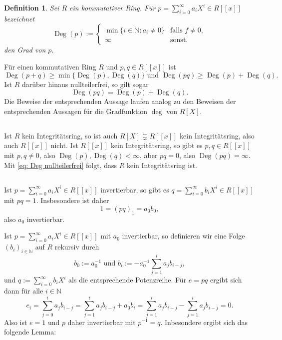 \documentclass[a4paper,10pt]{article}
\newtheorem*{defi}{Definition}
\theoremstyle{definition}
\newcommand{\N}{\mathbb{N}}
\newcommand{\Deg}{\operatorname{Deg}}
\begin{document}
\begin{defi}
Sei $R$ ein kommutativer Ring. Für $p = \sum_{i=0}^\infty a_i X^i \in R[\![x]\!]$ bezeichnet
\[
 \Deg(p) :=
 \begin{cases}
  \min \{i \in \N : a_i \neq 0\} & \text{falls } f \neq 0, \\
                          \infty & \text{sonst}.
 \end{cases}
\]
den Grad von $p$.
\end{defi}
Für einen kommutativen Ring $R$ und $p,q \in R[\![x]\!]$ ist
\begin{equation}\label{eq: Deg Ungleichungen}
 \Deg(p+q) \geq \min \{\Deg(p), \Deg(q)\} \text{ und }
 \Deg(pq) \geq \Deg(p) + \Deg(q).
\end{equation}
Ist $R$ darüber hinaus nullteilerfrei, so gilt sogar
\begin{equation}\label{eq: Deg nullteilerfrei}
 \Deg(pq) = \Deg(p) + \Deg(q).
\end{equation}
Die Beweise der entsprechenden Aussage laufen analog zu den Beweisen der entsprechenden Aussagen für die Gradfunktion $\deg$ von $R[X]$.


\subsection{}
Ist $R$ kein Integritätsring, so ist auch $R[X] \subsetneq R[\![x]\!]$ kein Integritätsring, also auch $R[\![x]\!]$ nicht. Ist $R[\![x]\!]$ kein Integritätsring, so gibt es $p, q \in R[\![x]\!]$ mit $p,q \neq 0$, also $\Deg(p), \Deg(q) < \infty$, aber $pq = 0$, also $\Deg(pq) = \infty$. Mit \eqref{eq: Deg nullteilerfrei} folgt, dass $R$ kein Integritätsring ist.


\subsection{}
Ist $p = \sum_{i=0}^\infty a_i X^i \in R[\![x]\!]$ invertierbar, so gibt es $q = \sum_{i=0}^\infty b_i X^i \in R[\![x]\!]$ mit $pq = 1$. Insbesondere ist daher
\[
 1 = (pq)_1 = a_0 b_0,
\]
also $a_0$ invertierbar.

Ist $p = \sum_{i=0}^\infty a_i X^i \in R[\![x]\!]$ mit $a_0$ invertierbar, so definieren wir eine Folge $(b_i)_{i \in \N}$ auf $R$ rekursiv durch
\[
 b_0 := a_0^{-1} \text{ und } b_i := -a_0^{-1} \sum_{j=1}^i a_j b_{i-j},
\]
und $q := \sum_{i=0}^\infty b_i X^i$ als die entsprechende Potenzreihe. Für $e = pq$ ergibt sich dann für alle $i \in \N$
\[
 e_i
 = \sum_{j=0}^i a_j b_{i-j}
 = \sum_{j=1}^i a_j b_{i-j} + a_0 b_i
 = \sum_{j=1}^i a_j b_{i-j} - \sum_{j=1}^i a_j b_{i-j}
 = 0.
\]
Also ist $e = 1$ und $p$ daher invertierbar mit $p^{-1} = q$. Inbesondere ergibt sich das folgende Lemma:
\end{document}
